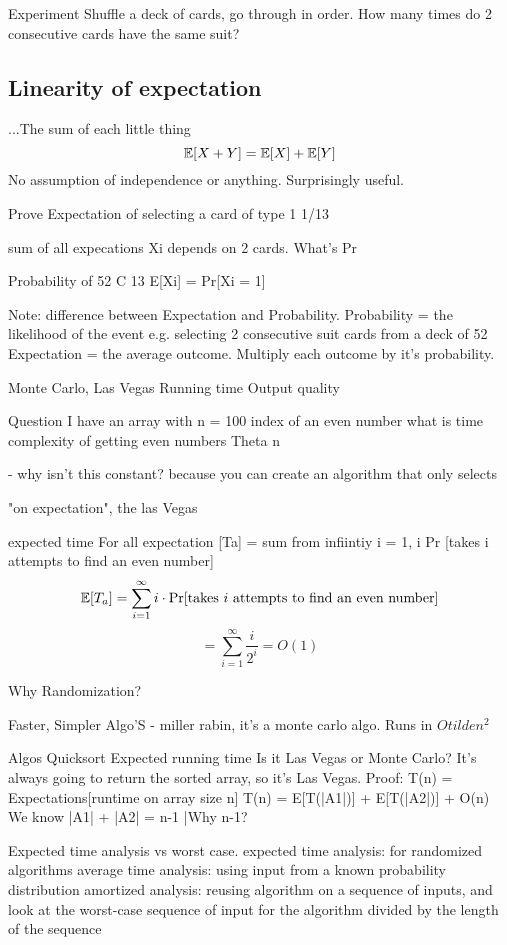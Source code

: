 Experiment
Shuffle a deck of cards, go through in order. How many times do 2 consecutive cards have the same suit?

\subsection{Linearity of expectation}
...The sum of each little thing
\[\mathbb{E} [ X + Y ] = \mathbb{E}[X] + \mathbb{E}[Y]\]
No assumption of independence or anything. Surprisingly useful. 

Prove
Expectation of selecting a card of type 1
1/13

sum of all expecations 
Xi depends on 2 cards. What's Pr

Probability of 
52 C 13
E[Xi] = Pr[Xi = 1] 


Note: difference between Expectation and Probability.
Probability = the likelihood of the event e.g. selecting 2 consecutive suit cards from a deck of 52
Expectation = the average outcome. Multiply each outcome by it's probability. 


Monte Carlo, Las Vegas
Running time
Output quality



Question
I have an array with n = 100
index of an even number
what is time complexity of getting even numbers
Theta n

- why isn't this constant? because you can create an algorithm that only selects 

"on expectation", the las Vegas

expected time 
For all expectation [Ta] = sum from infiintiy i = 1, i Pr [takes i attempts to find an even number]
\[
    \mathbb{E}[T_a] = \sum_{i=1}^{\infty} i \cdot \Pr[\text{takes $i$ attempts to find an even number}]
\]
\[
    = \sum_{i=1}^{\infty} \frac{i}{2^i} = O(1)    
\]


Why Randomization?


Faster, Simpler Algo'S
- miller rabin, it's a monte carlo algo. 
Runs in $O tilde n^2$



Algos
Quicksort
Expected running time 
Is it Las Vegas or Monte Carlo?
It's always going to return the sorted array, so it's Las Vegas.
Proof:
T(n) = Expectations[runtime on array size n]
T(n) = E[T(|A1|)] + E[T(|A2|)] + O(n)
We know |A1| + |A2| = n-1 |Why n-1? 

Expected time analysis vs worst case.
expected time analysis: for randomized algorithms
average time analysis: using input from a known probability distribution
amortized analysis: reusing algorithm on a sequence of inputs, and look at the worst-case sequence of input for the algorithm divided by the length of the sequence









